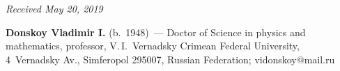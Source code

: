 \vspace*{-6pt}

\hfill{\small\textit{Received May 20, 2019}}



\Contrl

\noindent
\textbf{Donskoy Vladimir I.} (b.\ 1948)~--- 
Doctor of Science in physics and mathematics, professor, V.\,I.~Vernadsky 
Crimean Federal University, 4~Vernadsky Av., Simferopol 295007, 
Russian Federation; \mbox{vidonskoy@mail.ru}
\label{end\stat}

\renewcommand{\bibname}{\protect\rm Литература} 

\renewcommand{\figurename}{\protect\bf Рис.}